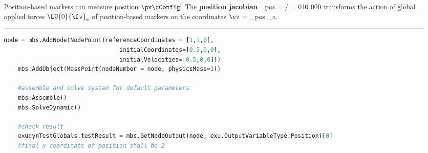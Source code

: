     Position-based markers can measure position $\pv\cConfig$. The {\bf position jacobian}  
    \be
      \Jm_{pos} = \partial \pv\cCur / \partial \cv\cCur =  {0}{1}{0} {0}{0}{0}
    \ee
    transforms the action of global applied forces $\LU{0}{\fv}_a$ of position-based markers on the coordinates $\cv$
    \be
      \Qm = \Jm_{pos} _a.
    \ee
\vspace{6pt}\par\noindent\rule{\textwidth}{0.4pt}
\label{miniExample_ObjectMassPoint}
\pythonstyle
\begin{lstlisting}[language=Python, firstnumber=1]
    node = mbs.AddNode(NodePoint(referenceCoordinates = [1,1,0], 
                                 initialCoordinates=[0.5,0,0],
                                 initialVelocities=[0.5,0,0]))
    mbs.AddObject(MassPoint(nodeNumber = node, physicsMass=1))

    #assemble and solve system for default parameters
    mbs.Assemble()
    mbs.SolveDynamic()

    #check result
    exudynTestGlobals.testResult = mbs.GetNodeOutput(node, exu.OutputVariableType.Position)[0]
    #final x-coordinate of position shall be 2
\end{lstlisting}

